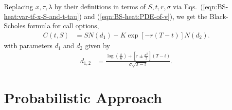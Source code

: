 \documentclass{book}
\begin{document}
Replacing $x, \tau, \lambda$ by their definitions in terms of $S, t, r, \sigma$ via Eqs.~(\ref{eqn:BS-heat:var-tf-x-S-and-t-tau}) and (\ref{eqn:BS-heat:PDE-of-v}), we get the Black-Scholes formula for call options,
\begin{align}
    C(t,S) &=  S N(d_1) - K \exp[-r (T-t)] N(d_2).
    \label{eqn:BS-form:call}
\end{align}
with parameters $d_1$ and $d_2$ given by
\begin{align}
    d_{1,2} &= \frac{\log(\frac{S}{K}) + \left[r \pm \frac{\sigma^2}{2}\right] (T-t) }{\sigma\sqrt{T-t}}.
    \label{eqn:BS-form:d1-and-d2}
\end{align}

\section{Probabilistic Approach}
\end{document}
